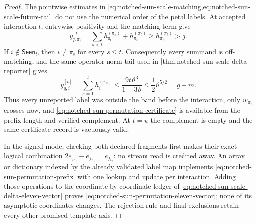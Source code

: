 \begin{proof}
The pointwise estimates in
\cref{eq:notched-sun-scale-matching,eq:notched-sun-scale-future-tail} do not
use the numerical order of the petal labels.  At accepted interaction $t$,
entrywise positivity and the matching term give
\begin{equation*}
 y_{q,\pi_t}^{[t]}
 =\sum_{s<t}h_{\pi_t}^{(\pi_s)}+h_{\pi_t}^{(\pi_t)}
 \geq h_{\pi_t}^{(\pi_t)}>g.
\end{equation*}
If $i\notin\mathsf{Seen}_t$, then $i\neq\pi_s$ for every $s\leq t$.
Consequently every summand is off-matching, and the same operator-norm tail
used in \cref{thm:notched-sun-scale-delta-reporter} gives
\begin{equation*}
 y_{q,i}^{[t]}
 =\sum_{s=1}^t h_i^{(\pi_s)}
 \leq\frac{9t\vartheta^3}{1-3\vartheta}
 \leq\frac12\vartheta^{5/2}=g-m.
\end{equation*}
Thus every unreported label was outside the band before the interaction,
only $w_{\pi_t}$ crosses now, and
\cref{eq:notched-sun-permutation-certificate} is available from the prefix
length and verified complement.  At $t=n$ the complement is empty and the
same certificate record is vacuously valid.

In the signed mode, checking both declared fragments first makes their exact
logical combination $2e_{f_{\pi_t}}-e_{f_{\pi_t}}=e_{f_{\pi_t}}$; no stream
read is credited away.  An array or dictionary indexed by the already
validated label map implements \cref{eq:notched-sun-permutation-prefix} with
one lookup and update per interaction.  Adding those operations to the
coordinate-by-coordinate ledger of
\cref{eq:notched-sun-scale-delta-eleven-vector} proves
\cref{eq:notched-sun-permutation-eleven-vector}; none of its asymptotic
coordinates changes.  The rejection rule and final exclusions retain every
other promised-template axis.
\end{proof}

